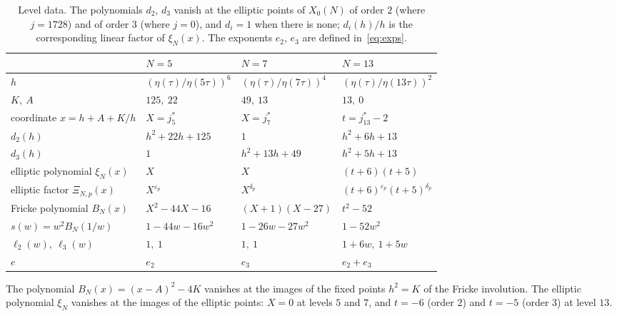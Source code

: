 \documentclass[11pt,a4paper]{article}
\theoremstyle{definition}
\theoremstyle{remark}
\numberwithin{equation}{section}
\begin{document}
\begin{table}[htbp]
\centering\small
\renewcommand{\arraystretch}{1.35}\setlength{\tabcolsep}{6pt}
\begin{tabular}{@{}llll@{}}
\toprule
 & $N=5$ & $N=7$ & $N=13$\\
\midrule
$h$ & $(\eta(\tau)/\eta(5\tau))^6$ & $(\eta(\tau)/\eta(7\tau))^4$ & $(\eta(\tau)/\eta(13\tau))^2$\\
$K,\ A$ & $125,\ 22$ & $49,\ 13$ & $13,\ 0$\\
coordinate $x=h+A+K/h$ & $X=j_5^*$ & $X=j_7^*$ & $t=j_{13}^*-2$\\
$d_2(h)$ & $h^2+22h+125$ & $1$ & $h^2+6h+13$\\
$d_3(h)$ & $1$ & $h^2+13h+49$ & $h^2+5h+13$\\
elliptic polynomial $\xi_N(x)$ & $X$ & $X$ & $(t+6)(t+5)$\\
elliptic factor $\Xi_{N,p}(x)$ & $X^{\varepsilon_p}$ & $X^{\delta_p}$ & $(t+6)^{\varepsilon_p}(t+5)^{\delta_p}$\\
Fricke polynomial $B_N(x)$ & $X^2-44X-16$ & $(X+1)(X-27)$ & $t^2-52$\\
$s(w)=w^2B_N(1/w)$ & $1-44w-16w^2$ & $1-26w-27w^2$ & $1-52w^2$\\
$\ell_2(w),\ \ell_3(w)$ & $1,\ 1$ & $1,\ 1$ & $1+6w,\ 1+5w$\\
$e$ & $e_2$ & $e_3$ & $e_2+e_3$\\
\bottomrule
\end{tabular}
\caption{Level data. The polynomials $d_2$, $d_3$ vanish at the elliptic points
of $X_0(N)$ of order $2$ (where $j=1728$) and of order $3$ (where $j=0$), and
$d_i=1$ when there is none; $d_i(h)/h$ is the corresponding linear factor of
$\xi_N(x)$. The exponents $e_2$, $e_3$ are defined in~\eqref{eq:exps}.}
\label{tab:data}
\end{table}

The polynomial $B_N(x)=(x-A)^2-4K$ vanishes at the images of the fixed points
$h^2=K$ of the Fricke involution. The elliptic polynomial $\xi_N$ vanishes at
the images of the elliptic points: $X=0$ at levels $5$ and $7$, and $t=-6$
(order $2$) and $t=-5$ (order $3$) at level $13$.
\end{document}
